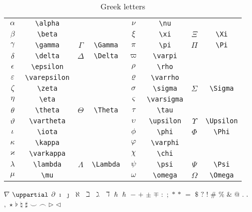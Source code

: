 \documentclass[captions=tableheading]{scrartcl}
\begin{document}
\begin{table}
  \caption{Greek letters}
  \label{tab:greek-letters}
  \centering
  \begin{tabular}[c]{cccc@{\hskip 3em}cccc}
    \toprule
    $\alpha$ & \verb|\alpha| & & &
    $\nu$ & \verb|\nu| & & \\
    $\beta$ & \verb|\beta| & & &
    $\xi$ & \verb|\xi| & $\Xi$ & \verb|\Xi| \\
    $\gamma$ & \verb|\gamma| & $\Gamma$ & \verb|\Gamma| &
    $\pi$ & \verb|\pi| & $\Pi$ & \verb|\Pi| \\
    $\delta$ & \verb|\delta| & $\Delta$ & \verb|\Delta| &
    $\varpi$ & \verb|\varpi| & & \\
    $\epsilon$ & \verb|\epsilon| & & &
    $\rho$ & \verb|\rho| & & \\
    \addlinespace
    $\varepsilon$ & \verb|\varepsilon| & & &
    $\varrho$ & \verb|\varrho| & & \\
    $\zeta$ & \verb|\zeta| & & &
    $\sigma$ & \verb|\sigma| & $\Sigma$ & \verb|\Sigma| \\
    $\eta$ & \verb|\eta| & & &
    $\varsigma$ & \verb|\varsigma| & & \\
    $\theta$ & \verb|\theta| & $\Theta$ & \verb|\Theta| &
    $\tau$ & \verb|\tau| & & \\
    $\vartheta$ & \verb|\vartheta| & & &
    $\upsilon$ & \verb|\upsilon| & $\Upsilon$ & \verb|\Upsilon| \\
    \addlinespace
    $\iota$ & \verb|\iota| & & &
    $\phi$ & \verb|\phi| & $\Phi$ & \verb|\Phi| \\
    $\kappa$ & \verb|\kappa| & & &
    $\varphi$ & \verb|\varphi| & & \\
    $\varkappa$ & \verb|\varkappa| & & &
    $\chi$ & \verb|\chi| & & \\
    $\lambda$ & \verb|\lambda| & $\Lambda$ & \verb|\Lambda| &
    $\psi$ & \verb|\psi| & $\Psi$ & \verb|\Psi| \\
    $\mu$ & \verb|\mu| & & &
    $\omega$ & \verb|\omega| & $\Omega$ & \verb|\Omega| \\
    \bottomrule
  \end{tabular}
\end{table}

$\nabla$
$\uppartial$
$\partial$
$\imath$
$\jmath$
$\aleph$
$\beth$
$\gimel$
$\daleth$
$\hbar$
$\hslash$
$-$
$+$
$\pm$
$\mp$
$:$
$;$
$*$
$\ast$
$=$
$\mathdollar$
$?$
$!$
$\#$
$\%$
$\&$
$@$
$.$
$\ldotp$
$,$
$\star$
$\flat$
$\natural$
$\sharp$
$\smile$
$\frown$
$\triangleright$
$\triangleleft$
\end{document}

